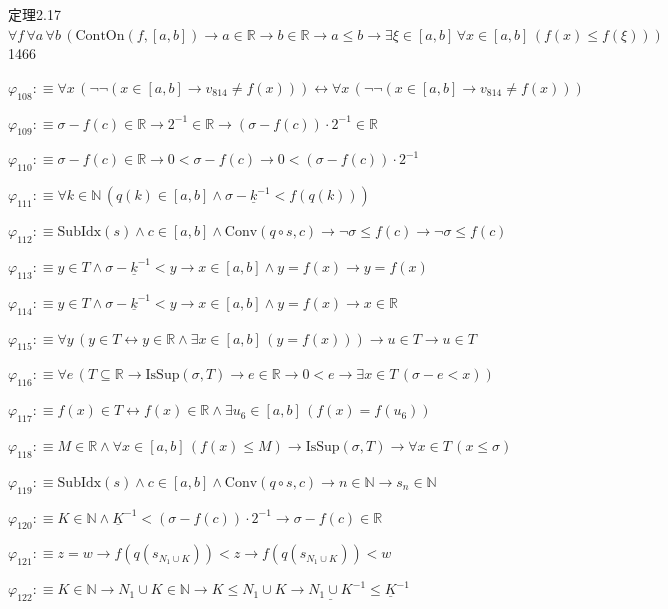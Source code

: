 \begin{fullproof}{定理2.17}{$\forall f\,\forall a\,\forall b\,(\mathrm{ContOn}(f,[a,b]) \to a \in \mathbb{R} \to b \in \mathbb{R} \to a \leq b \to \exists \xi \in [a,b]\,\forall x \in [a,b]\,(f(x) \leq f(\xi)))$}{1466}
\begin{abbrevlist}
\item $\varphi_{108} :\equiv \forall x\,(\neg \neg (x \in [a,b] \to v_{814} \neq f(x))) \leftrightarrow \forall x\,(\neg \neg (x \in [a,b] \to v_{814} \neq f(x)))$
\item $\varphi_{109} :\equiv \sigma - f(c) \in \mathbb{R} \to 2^{-1} \in \mathbb{R} \to (\sigma - f(c)) \cdot 2^{-1} \in \mathbb{R}$
\item $\varphi_{110} :\equiv \sigma - f(c) \in \mathbb{R} \to 0 < \sigma - f(c) \to 0 < (\sigma - f(c)) \cdot 2^{-1}$
\item $\varphi_{111} :\equiv \forall k \in \mathbb{N}\,(q(k) \in [a,b] \land \sigma - \underline{k}^{-1} < f(q(k)))$
\item $\varphi_{112} :\equiv \mathrm{SubIdx}(s) \land c \in [a,b] \land \mathrm{Conv}(q \circ s,c) \to \neg \sigma \leq f(c) \to \neg \sigma \leq f(c)$
\item $\varphi_{113} :\equiv y \in T \land \sigma - \underline{k}^{-1} < y \to x \in [a,b] \land y = f(x) \to y = f(x)$
\item $\varphi_{114} :\equiv y \in T \land \sigma - \underline{k}^{-1} < y \to x \in [a,b] \land y = f(x) \to x \in \mathbb{R}$
\item $\varphi_{115} :\equiv \forall y\,(y \in T \leftrightarrow y \in \mathbb{R} \land \exists x \in [a,b]\,(y = f(x))) \to u \in T \to u \in T$
\item $\varphi_{116} :\equiv \forall e\,(T \subseteq \mathbb{R} \to \mathrm{IsSup}(\sigma,T) \to e \in \mathbb{R} \to 0 < e \to \exists x \in T\,(\sigma - e < x))$
\item $\varphi_{117} :\equiv f(x) \in T \leftrightarrow f(x) \in \mathbb{R} \land \exists u_{6} \in [a,b]\,(f(x) = f(u_{6}))$
\item $\varphi_{118} :\equiv M \in \mathbb{R} \land \forall x \in [a,b]\,(f(x) \leq M) \to \mathrm{IsSup}(\sigma,T) \to \forall x \in T\,(x \leq \sigma)$
\item $\varphi_{119} :\equiv \mathrm{SubIdx}(s) \land c \in [a,b] \land \mathrm{Conv}(q \circ s,c) \to n \in \mathbb{N} \to s_{n} \in \mathbb{N}$
\item $\varphi_{120} :\equiv K \in \mathbb{N} \land \underline{K}^{-1} < (\sigma - f(c)) \cdot 2^{-1} \to \sigma - f(c) \in \mathbb{R}$
\item $\varphi_{121} :\equiv z = w \to f(q(s_{N_{1} \cup K})) < z \to f(q(s_{N_{1} \cup K})) < w$
\item $\varphi_{122} :\equiv K \in \mathbb{N} \to N_{1} \cup K \in \mathbb{N} \to K \leq N_{1} \cup K \to \underline{N_{1} \cup K}^{-1} \leq \underline{K}^{-1}$

\end{abbrevlist}
\end{fullproof}
